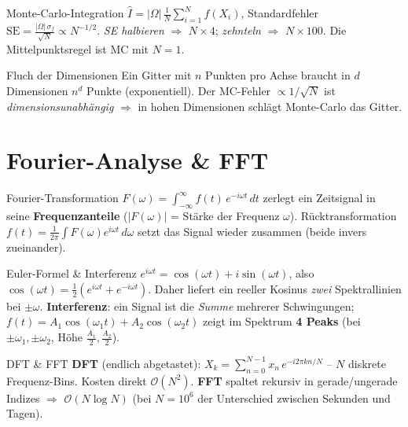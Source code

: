 \documentclass[a4paper,11pt]{article}
\begin{document}
\begin{satz}{Monte-Carlo-Integration}
$\displaystyle \hat I=|\Omega|\,\tfrac1N\sum_{i=1}^N f(X_i)$, Standardfehler
$\mathrm{SE}=\frac{|\Omega|\,\sigma_f}{\sqrt N}\propto N^{-1/2}$. \emph{SE halbieren} $\Rightarrow$
$N\times4$; \emph{zehnteln} $\Rightarrow$ $N\times100$. Die Mittelpunktsregel ist MC mit $N=1$.
\end{satz}

\begin{intu}{Fluch der Dimensionen}
Ein Gitter mit $n$ Punkten pro Achse braucht in $d$ Dimensionen $n^d$ Punkte (exponentiell). Der
MC-Fehler $\propto1/\sqrt N$ ist \emph{dimensionsunabhängig} $\Rightarrow$ in hohen Dimensionen
schlägt Monte-Carlo das Gitter.
\end{intu}

\section{Fourier-Analyse \& FFT}

\begin{defi}{Fourier-Transformation}
$F(\omega)=\int_{-\infty}^{\infty} f(t)\,e^{-i\omega t}\,dt$ zerlegt ein Zeitsignal in seine
\textbf{Frequenzanteile} ($|F(\omega)|$ = Stärke der Frequenz $\omega$). Rücktransformation
$f(t)=\frac{1}{2\pi}\int F(\omega)e^{i\omega t}\,d\omega$ setzt das Signal wieder zusammen
(beide invers zueinander).
\end{defi}

\begin{intu}{Euler-Formel \& Interferenz}
$e^{i\omega t}=\cos(\omega t)+i\sin(\omega t)$, also
$\cos(\omega t)=\tfrac12(e^{i\omega t}+e^{-i\omega t})$. Daher liefert ein reeller Kosinus
\emph{zwei} Spektrallinien bei $\pm\omega$. \textbf{Interferenz}: ein Signal ist die \emph{Summe}
mehrerer Schwingungen; $f(t)=A_1\cos(\omega_1 t)+A_2\cos(\omega_2 t)$ zeigt im Spektrum
\textbf{4 Peaks} (bei $\pm\omega_1,\pm\omega_2$, Höhe $\tfrac{A_1}{2},\tfrac{A_2}{2}$).
\end{intu}

\begin{satz}{DFT \& FFT}
\textbf{DFT} (endlich abgetastet): $X_k=\sum_{n=0}^{N-1}x_n\,e^{-i2\pi kn/N}$ -- $N$ diskrete
Frequenz-Bins. Kosten direkt $\mathcal O(N^2)$. \textbf{FFT} spaltet rekursiv in gerade/ungerade
Indizes $\Rightarrow$ $\mathcal O(N\log N)$ (bei $N{=}10^6$ der Unterschied zwischen Sekunden und
Tagen).
\end{satz}
\end{document}
